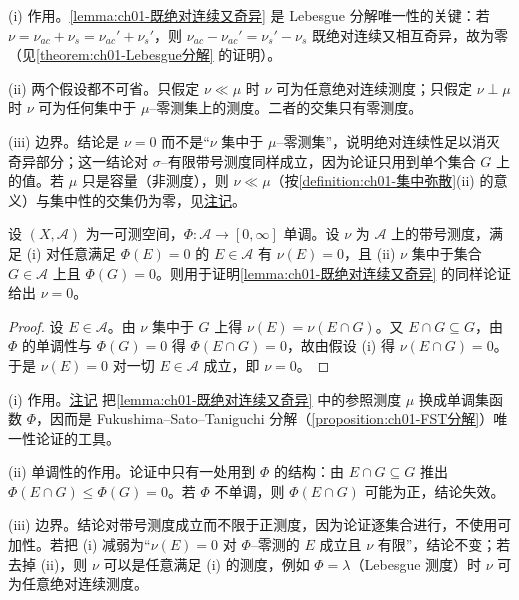 \documentclass[../../main.tex]{subfiles}%
\begin{document}
\begin{remark}\label{remark:ch01-既绝对连续又奇异动机}
(i) 作用。\cref{lemma:ch01-既绝对连续又奇异} 是 Lebesgue 分解唯一性的关键：若 $\nu=\nu_{ac}+\nu_s=\nu_{ac}'+\nu_s'$，则 $\nu_{ac}-\nu_{ac}'=\nu_s'-\nu_s$ 既绝对连续又相互奇异，故为零（见\cref{theorem:ch01-Lebesgue分解} 的证明）。

(ii) 两个假设都不可省。只假定 $\nu\ll\mu$ 时 $\nu$ 可为任意绝对连续测度；只假定 $\nu\perp\mu$ 时 $\nu$ 可为任何集中于 $\mu$--零测集上的测度。二者的交集只有零测度。

(iii) 边界。结论是 $\nu=0$ 而不是“$\nu$ 集中于 $\mu$--零测集”，说明绝对连续性足以消灭奇异部分；这一结论对 $\sigma$--有限带号测度同样成立，因为论证只用到单个集合 $G$ 上的值。若 $\mu$ 只是容量（非测度），则 $\nu\ll\mu$（按\cref{definition:ch01-集中弥散}(ii) 的意义）与集中性的交集仍为零，见\hyperref[remark:ch01-集中于零容量]{注记}。
\end{remark}

\begin{remark}\label{remark:ch01-集中于零容量}
设 $(X,\mathcal{A})$ 为一可测空间，$\Phi:\mathcal{A}\to[0,\infty]$ 单调。设 $\nu$ 为 $\mathcal{A}$ 上的带号测度，满足 (i) 对任意满足 $\Phi(E)=0$ 的 $E\in\mathcal{A}$ 有 $\nu(E)=0$，且 (ii) $\nu$ 集中于集合 $G\in\mathcal{A}$ 上且 $\Phi(G)=0$。则用于证明\cref{lemma:ch01-既绝对连续又奇异} 的同样论证给出 $\nu=0$。
\end{remark}

\begin{proof}
设 $E\in\mathcal{A}$。由 $\nu$ 集中于 $G$ 上得 $\nu(E)=\nu(E\cap G)$。又 $E\cap G\subseteq G$，由 $\Phi$ 的单调性与 $\Phi(G)=0$ 得 $\Phi(E\cap G)=0$，故由假设 (i) 得 $\nu(E\cap G)=0$。于是 $\nu(E)=0$ 对一切 $E\in\mathcal{A}$ 成立，即 $\nu=0$。
\end{proof}

\begin{remark}\label{remark:ch01-集中于零容量动机}
(i) 作用。\hyperref[remark:ch01-集中于零容量]{注记} 把\cref{lemma:ch01-既绝对连续又奇异} 中的参照测度 $\mu$ 换成单调集函数 $\Phi$，因而是 Fukushima--Sato--Taniguchi 分解（\cref{proposition:ch01-FST分解}）唯一性论证的工具。

(ii) 单调性的作用。论证中只有一处用到 $\Phi$ 的结构：由 $E\cap G\subseteq G$ 推出 $\Phi(E\cap G)\leqslant\Phi(G)=0$。若 $\Phi$ 不单调，则 $\Phi(E\cap G)$ 可能为正，结论失效。

(iii) 边界。结论对带号测度成立而不限于正测度，因为论证逐集合进行，不使用可加性。若把 (i) 减弱为“$\nu(E)=0$ 对 $\Phi$--零测的 $E$ 成立且 $\nu$ 有限”，结论不变；若去掉 (ii)，则 $\nu$ 可以是任意满足 (i) 的测度，例如 $\Phi=\lambda$（Lebesgue 测度）时 $\nu$ 可为任意绝对连续测度。
\end{remark}
\end{document}
